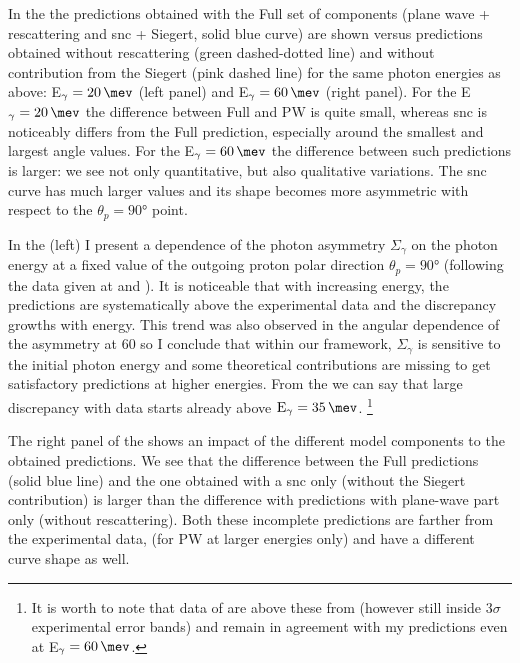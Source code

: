     In the  the predictions obtained with the Full set of
     components (plane wave + rescattering and \gls{snc} + Siegert, solid blue curve) are shown
     versus predictions obtained without rescattering (green dashed-dotted line)
     and without contribution from the Siegert (pink dashed line) for the same 
     photon energies as above: E$_\gamma=\SI{20}{\mev}$ (left panel)
     and E$_\gamma=\SI{60}{\mev}$ (right panel).
     For the E$_\gamma=\SI{20}{\mev}$ the difference between Full and PW
     is quite small, whereas \gls{snc} is noticeably differs from the Full prediction,
     especially around the smallest and largest angle values.
     For the E$_\gamma=\SI{60}{\mev}$ the difference between such predictions 
     is larger: we see not only quantitative, but also qualitative variations.
     The \gls{snc} curve has much larger values and its shape becomes 
     more asymmetric with respect to the $\theta_p = \ang{90}$ point.

     In the  (left) I present a dependence of the photon asymmetry
     $\Sigma_\gamma$ on the photon energy at a fixed value
     of the outgoing proton polar direction $\theta_p = \ang{90}$ 
     (following the data given at \cite{delbianco_1981} and \cite{depascale_asymmetry}).
     It is noticeable that with increasing energy, the predictions
     are systematically above the experimental data and the discrepancy growths with energy.
     This trend
     was also observed in the angular dependence of the asymmetry at \SI{60}{\mev}
     so I conclude that within our framework, 
     $\Sigma_\gamma$ is sensitive to the initial photon energy and some theoretical
     contributions are missing to get satisfactory predictions
     at higher energies. From the  we can say that
     large discrepancy with data starts already above $\text{E}_\gamma = \SI{35}{\mev}$.
     \footnote{It is worth to note that data of \cite{depascale_asymmetry} are
     above these from \cite{delbianco_1981} (however still inside $3\sigma$ experimental
     error bands) and remain in agreement with my predictions even at E$_\gamma=\SI{60}{\mev}$.}

    The right panel of the  shows an impact of the
    different model components to the obtained predictions.
    We see that the difference between the Full predictions (solid blue line)
    and the one obtained with a \gls{snc} only (without the Siegert contribution)
    is larger than the difference with predictions with plane-wave part only (without rescattering).
    Both these incomplete predictions are farther from the experimental data,
    (for PW at larger energies only) and have a different curve shape as well. 

